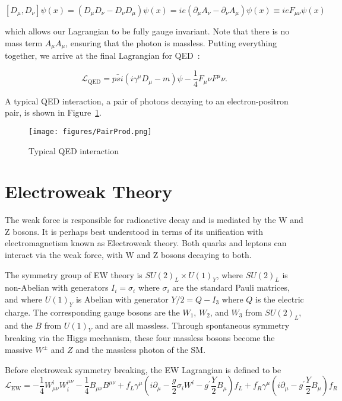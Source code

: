 \begin{equation}
\left[D_{\mu}, D_{\nu}\right]\psi(x) = \left(D_{\mu}D_{\nu} - D_{\nu}D_{\mu}\right)\psi(x)
= ie\left(\partial_{\mu}A_{\nu} - \partial_{\nu}A_{\mu}\right)\psi(x) \equiv ieF_{\mu\nu}\psi(x)
\end{equation}

\noindent which allows our Lagrangian to be fully gauge invariant. Note that there is no mass term $A_{\mu}A_{\mu}$, ensuring that the photon is massless. Putting everything together, we arrive at the final Lagrangian for QED~\cite{halzen}:

\begin{equation}
\mathcal{L}_{\text{QED}} = \bar{psi}\left(i\gamma^{\mu}D_{\mu} - m\right)\psi - \frac{1}{4}F_{\mu}{\nu}F^{\mu}{\nu}.
\end{equation} 

\noindent A typical QED interaction, a pair of photons decaying to an electron-positron pair, is shown in Figure~\ref{fig:FeynmanQED}.

\begin{figure}
\centering
  \texttt{[image: figures/PairProd.png]}
  \caption{\label{fig:FeynmanQED} Typical QED interaction\cite{QEDFeynman}}
\end{figure}


\section{Electroweak Theory}
\label{sec:EW}

The weak force is responsible for radioactive decay and is mediated by the W and Z bosons. It is perhaps best understood in terms of its unification with electromagnetism known as Electroweak theory. Both quarks and leptons can interact via the weak force, with W and Z bosons decaying to both. 

The symmetry group of EW theory is $SU(2)_{L} \times U(1)_{Y}$, where $SU(2)_{L}$ is non-Abelian with generators $I_{i} = \sigma_{i}$ where $\sigma_{i}$ are the standard Pauli matrices, and where $U(1)_{Y}$ is Abelian with generator $Y/2 = Q - I_{3}$ where $Q$ is the electric charge. The corresponding gauge bosons are the $W_{1}$, $W_{2}$, and $W_{3}$ from $SU(2)_{L}$, and the $B$ from $U(1)_{Y}$ and are all massless. Through spontaneous symmetry breaking via the Higgs mechanism, these four massless bosons become the massive $W^{\pm}$ and $Z$ and the massless photon of the SM.

Before electroweak symmetry breaking, the EW Lagrangian is defined to be\cite{srednicki}
\begin{equation}
\mathcal{L}_{\text{EW}} = -\frac{1}{4}W^{i}_{\mu\nu}W^{\mu\nu}_{i} - \frac{1}{4}B_{\mu\nu}B^{\mu\nu} + \bar{f_{L}}\gamma^{\mu}\left(i\partial_{\mu} - \frac{g}{2}\sigma_{i}W^{i} - g^{\prime}\frac{Y}{2}B_{\mu}\right)f_{L} + 
\bar{f_{R}}\gamma^{\mu}\left(i\partial_{\mu} - g^{\prime}\frac{Y}{2}B_{\mu}\right)f_{R}
\end{equation}

